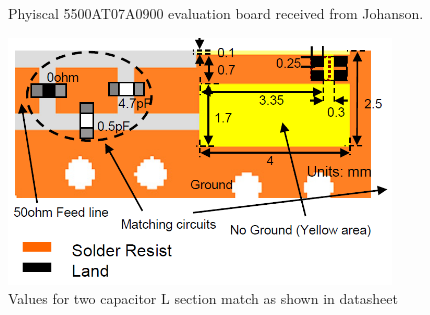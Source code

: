 \documentclass[12pt]{usfcoe}
\begin{document}
	\begin{figure}%
	    \caption{Phyiscal 5500AT07A0900 evaluation board received from Johanson.}%
	    \label{fig:5500_real} %
    \end{figure} 
    
    \begin{figure}[H]
		\begin{center}
        	\includegraphics[width=4in]{images/5500_simulation/5500_layout_datasheet.PNG} 
			\caption{Values for two capacitor L section match as shown in datasheet} 
			\label{fig:5500_datasheet_vals}
		\end{center}
	\end{figure}  
\end{document}
